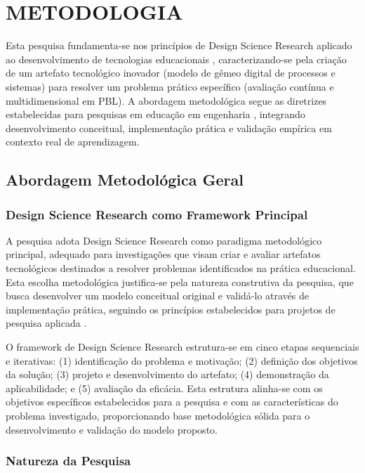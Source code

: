 \documentclass[12pt, a4paper, oneside, brazilian]{abntex2}
\begin{document}
\section{METODOLOGIA}

Esta pesquisa fundamenta-se nos princípios de Design Science Research aplicado ao desenvolvimento de tecnologias educacionais \cite{gil91}, caracterizando-se pela criação de um artefato tecnológico inovador (modelo de gêmeo digital de processos e sistemas) para resolver um problema prático específico (avaliação contínua e multidimensional em PBL). A abordagem metodológica segue as diretrizes estabelecidas para pesquisas em educação em engenharia \cite{andrade99}, integrando desenvolvimento conceitual, implementação prática e validação empírica em contexto real de aprendizagem.

\subsection{Abordagem Metodológica Geral}

\subsubsection{Design Science Research como Framework Principal}

A pesquisa adota Design Science Research como paradigma metodológico principal, adequado para investigações que visam criar e avaliar artefatos tecnológicos destinados a resolver problemas identificados na prática educacional. Esta escolha metodológica justifica-se pela natureza construtiva da pesquisa, que busca desenvolver um modelo conceitual original e validá-lo através de implementação prática, seguindo os princípios estabelecidos para projetos de pesquisa aplicada \cite{gil91}.

O framework de Design Science Research estrutura-se em cinco etapas sequenciais e iterativas: (1) identificação do problema e motivação; (2) definição dos objetivos da solução; (3) projeto e desenvolvimento do artefato; (4) demonstração da aplicabilidade; e (5) avaliação da eficácia. Esta estrutura alinha-se com os objetivos específicos estabelecidos para a pesquisa e com as características do problema investigado, proporcionando base metodológica sólida para o desenvolvimento e validação do modelo proposto.

\subsubsection{Natureza da Pesquisa}
\end{document}

